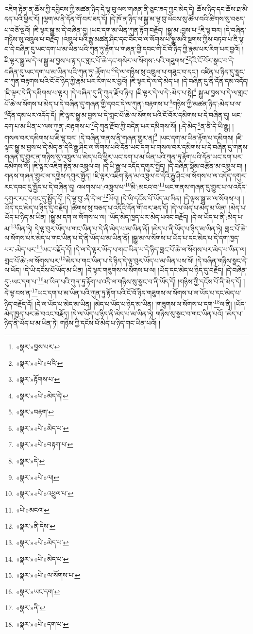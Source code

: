 འཇིག་རྟེན་ན་ཆོས་ཀྱི་དབྱིངས་ཀྱི་མཚན་ཉིད་དེ་ལྟ་བུ་ལས་གཞན་ནི་ཅུང་ཟད་ཀྱང་མེད་དེ། ཆོས་ཉིད་དང་ཆོས་ཐ་མི་དད་པའི་ཕྱིར་རོ། །ལྷག་མ་ནི་དོན་གོ་བར་ཟད་དོ། །དེ་ཁོ་ན་ཉིད་ལ་སྒྱུ་མ་ལྟ་བུ་ཡོངས་སུ་ཚོལ་བའི་ཚིགས་སུ་བཅད་པ་བཅོ་ལྔའོ། །ཇི་ལྟར་སྒྱུ་མ་དེ་བཞིན་དུ། །ཡང་དག་མ་ཡིན་ཀུན་རྟོག་བརྗོད། །སྒྱུ་མ་:བྱས་པ་\footnote{«སྣར་»བྱས་པར་}ཇི་ལྟ་བར། །དེ་བཞིན་གཉིས་སུ་འཁྲུལ་པ་བརྗོད། །འཁྲུལ་པའི་རྒྱུ་མཚན་ཤིང་དང་བོང་བ་ལ་སོགས་པ་སྒྱུ་མའི་སྔགས་ཀྱིས་བཏབ་པ་ཇི་ལྟ་བ་དེ་བཞིན་དུ་ཡང་དག་པ་མ་ཡིན་པའི་ཀུན་ཏུ་རྟོག་པ་གཞན་གྱི་དབང་གི་ངོ་བོ་ཉིད་ཀྱི་རྣམ་པར་རིག་པར་བྱའོ། །ཇི་ལྟར་སྒྱུ་མ་དེ་ལ་སྒྱུ་མ་བྱས་པ་རྟ་དང་གླང་པོ་ཆེ་དང་གསེར་ལ་སོགས་:པའི་གཟུགས་\footnote{«སྣར་»«པེ་»པའི་}དེའི་ངོ་བོར་སྣང་བ་དེ་བཞིན་དུ་ཡང་དག་པ་མ་ཡིན་པའི་ཀུན་ཏུ་:རྟོག་པ་\footnote{«སྣར་»རྟོགས་པ་}དེ་ལ་གཉིས་སུ་འཁྲུལ་པ་གཟུང་བ་དང་། འཛིན་པ་ཉིད་དུ་སྣང་བ་ཀུན་བརྟགས་པའི་ངོ་བོ་ཉིད་ཀྱི་རྣམ་པར་རིག་པར་བྱའོ། །ཇི་ལྟར་དེ་ལ་དེ་མེད་པ། །དེ་བཞིན་དུ་ནི་དོན་དམ་འདོད། །ཇི་ལྟར་དེ་ནི་དམིགས་པ་ལྟར། །དེ་བཞིན་དུ་ནི་ཀུན་རྫོབ་ཉིད། །ཇི་ལྟར་དེ་ལ་དེ་:མེད་པ་སྟེ།\footnote{«སྣར་»«པེ་»མེད་དེ།} སྒྱུ་མ་བྱས་པ་དེ་ལ་གླང་པོ་ཆེ་ལ་སོགས་པ་མེད་པ་དེ་བཞིན་དུ་གཞན་གྱི་དབང་དེ་ལ་ཀུན་:བརྟགས་པ་\footnote{«སྣར་»བརྟག་}གཉིས་ཀྱི་མཚན་ཉིད་:མེད་པ་ལ་\footnote{«སྣར་»«པེ་»མེད་པ་}དོན་དམ་པར་འདོད་དོ། །ཇི་ལྟར་སྒྱུ་མ་བྱས་པ་དེ་གླང་པོ་ཆེ་ལ་སོགས་པའི་ངོ་བོར་དམིགས་པ་དེ་བཞིན་དུ། ཡང་དག་པ་མ་ཡིན་པ་ལས་ཀུན་:བརྟགས་པ་\footnote{«སྣར་»«པེ་»བརྟག་པ་}དེ་ཀུན་རྫོབ་ཀྱི་བདེན་པར་དམིགས་སོ། །:དེ་མེད་\footnote{«སྣར་»དེ་}ན་ནི་དེ་ཡི་རྒྱུ། །གསལ་བར་དམིགས་པ་ཇི་ལྟ་བར། །དེ་བཞིན་གནས་ནི་གཞན་གྱུར་ན།\footnote{«སྣར་»«པེ་»ལ།} །ཡང་དག་མ་ཡིན་རྟོག་པ་དམིགས། །ཇི་ལྟར་སྒྱུ་མ་བྱས་པ་དེ་མེད་ན་དེའི་རྒྱུ་ཤིང་ལ་སོགས་པའི་དོན་ཡང་དག་པ་གསལ་བར་དམིགས་པ་དེ་བཞིན་དུ་གནས་གཞན་དུ་གྱུར་ན་གཉིས་སུ་འཁྲུལ་པ་མེད་པའི་ཕྱིར་ཡང་དག་པ་མ་ཡིན་པའི་ཀུན་ཏུ་རྟོག་པའི་དོན་ཡང་དག་པར་དམིགས་སོ། །ཇི་ལྟར་འཇིག་རྟེན་མ་འཁྲུལ་བ། །དེ་ཡི་རྒྱུ་ལ་འདོད་དགུར་སྤྱོད། །དེ་བཞིན་སྡོམ་བརྩོན་མ་འཁྲུལ་བ། །གནས་གཞན་གྱུར་ལ་དགྱེས་དགུར་སྤྱོད། །ཇི་ལྟར་འཇིག་རྟེན་མ་འཁྲུལ་བ་དེའི་རྒྱུ་ཤིང་ལ་སོགས་པ་ལ་འདོད་དགུར་རང་དབང་དུ་སྤྱོད་པ་དེ་བཞིན་དུ། འཕགས་པ་:འཁྲུལ་པ་\footnote{«སྣར་»«པེ་»འཕྲུལ་པ་}མི་:མངའ་བ་\footnote{«པེ་»མངའ་}ཡང་གནས་གཞན་དུ་གྱུར་པ་ལ་འདོད་དགུར་རང་དབང་དུ་སྤྱོད་དོ། །དེ་ལྟ་བུ་:ནི་དེ་ལ་\footnote{«སྣར་»ནི་དེས་}ཡོད། །དེ་ཡི་དངོས་པོ་ཡོད་མ་ཡིན། །དེ་ལྟས་སྒྱུ་མ་ལ་སོགས་པ། །ཡོད་དང་མེད་པ་ཉིད་དུ་བརྗོད། །ཚིགས་སུ་བཅད་པ་འདིའི་དོན་གོ་བར་ཟད་དོ། །དེ་ལ་ཡོད་པ་མེད་མ་ཡིན། །མེད་པ་ཡོད་པ་ཉིད་མ་ཡིན། །སྒྱུ་མ་དག་ལ་སོགས་པ་ལ། །ཡོད་མེད་ཁྱད་པར་མེད་པའང་བརྗོད། །དེ་ལ་ཡོད་པ་ནི་:མེད་པ་མ་\footnote{«སྣར་»«པེ་»མེད་པ་}ཡིན་ཏེ། དེ་ལྟ་བུར་ཡོད་པ་གང་ཡིན་པ་དེ་ནི་མེད་པ་མ་ཡིན་ནོ། །མེད་པ་ནི་ཡོད་པ་ཉིད་མ་ཡིན་ཏེ། གླང་པོ་ཆེ་ལ་སོགས་པར་མེད་པ་གང་ཡིན་པ་དེ་ནི་ཡོད་པ་མ་ཡིན་ནོ། །སྒྱུ་མ་ལ་སོགས་པ་ཡོད་པ་དང་མེད་པ་དེ་དག་ཁྱད་པར་:མེད་པར་\footnote{«སྣར་»«པེ་»མེད་པ་}ཡང་བརྗོད་དོ། །དེ་ལ་དེ་ལྟར་ཡོད་པ་གང་ཡིན་པ་དེ་ཉིད་གླང་པོ་ཆེ་ལ་སོགས་པར་མེད་པ་ཡིན་ལ། གླང་པོ་ཆེ་:ལ་སོགས་པར་\footnote{«སྣར་»«པེ་»ལ་སོགས་པ་}མེད་པ་གང་ཡིན་པ་དེ་ཉིད་དེ་ལྟ་བུར་ཡོད་པ་མ་ཡིན་པས་སོ། །དེ་བཞིན་གཉིས་སྣང་དེ་ལ་ཡོད། །དེ་ཡི་དངོས་པོ་ཡོད་མ་ཡིན། །དེ་ལྟར་གཟུགས་ལ་སོགས་པ་ལ། །ཡོད་དང་མེད་པ་ཉིད་དུ་བརྗོད། །དེ་བཞིན་དུ་:ཡང་དག་པ་\footnote{«སྣར་»ཡང་དག་}མ་ཡིན་པའི་ཀུན་ཏུ་རྟོག་པ་འདི་ལ་གཉིས་སུ་སྣང་བ་ནི་ཡོད་དོ། །གཉིས་ཀྱི་དངོས་པོ་ནི་མེད་དོ། །དེ་ལྟ་བས་ན་\footnote{«སྣར་»ནི་}ཡང་དག་པ་མ་ཡིན་པའི་ཀུན་ཏུ་རྟོག་པའི་ངོ་བོ་ཉིད་གཟུགས་ལ་སོགས་པ་ལ་ཡོད་པ་དང་མེད་པ་ཉིད་བརྗོད་དོ། །དེ་ལ་ཡོད་པ་མེད་མ་ཡིན། །མེད་པ་ཡོད་པ་ཉིད་མ་ཡིན། །གཟུགས་ལ་སོགས་པ་དག་\footnote{«སྣར་»«པེ་»དག་པ་}ལ་ནི། །ཡོད་མེད་ཁྱད་པར་ཆེ་བའང་བརྗོད། །དེ་ལ་ཡོད་པ་ཉིད་ནི་མེད་པ་མ་ཡིན་ཏེ། གཉིས་སུ་སྣང་བ་གང་ཡིན་པའོ། །མེད་པ་ཉིད་ནི་ཡོད་པ་མ་ཡིན་ཏེ། གཉིས་ཀྱི་དངོས་པོ་མེད་པ་ཉིད་གང་ཡིན་པའོ། །
